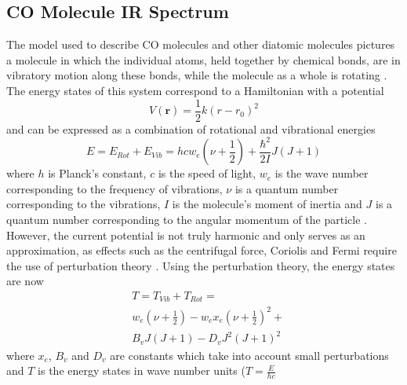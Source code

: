 \documentclass[reprint,amsmath,amssymb,aps, prl]{revtex4-2}
\begin{document}
\subsection{CO Molecule IR Spectrum}
The model used to describe CO molecules
and other diatomic molecules pictures a molecule in which the individual atoms, held together by chemical bonds, are in vibratory motion along these bonds, while the molecule as a whole is rotating \cite{alpert}. The energy states of this system correspond to a Hamiltonian with a potential 
\begin{equation} \label{eq:CO_Potential}
V(\boldsymbol{r})=\frac{1}{2}k(r-r_0)^2
\end{equation}
and can be expressed as a combination of rotational and vibrational energies
\begin{equation} \label{eq:CO_RotVibEnrg}
E=E_{Rot}+E_{Vib}= hcw_{e}(\nu +\frac{1}{2}) + \frac{\hbar  ^2}{2I}J(J+1)
\end{equation}
where $h$ is Planck's constant, $c$ is the speed of light, $w_{e}$ is the wave number corresponding to the frequency of vibrations, $\nu$ is a quantum number corresponding to the vibrations,  $I$ is the molecule's moment of inertia and $J$ is a quantum number corresponding to the angular momentum of the particle \cite{griffithsQM}. However, the  current potential is not truly harmonic and only serves as an approximation,
as effects such as the centrifugal force, Coriolis and Fermi \cite{alpert} require the use of perturbation theory \cite{samurai}. Using the perturbation theory, the energy states are now
\begin{equation} \label{eq:CO_PeturbRotVibEnrg}
\begin{split}
& T=T_{Vib}+T_{Rot}=\\
& w_{e}(\nu +\frac{1}{2}) -w_{e}x_{e}(\nu +\frac{1}{2})^2+ \\
& B_{v}J(J+1)-D_{v}J^2(J+1)^2 
\end{split}
\end{equation}
where $x_{e}$, $B_{v}$ and $D_{v}$ are constants which take into account small perturbations and $T$ is the energy states in wave number units ($T=\frac{E}{hc}$
\end{document}
